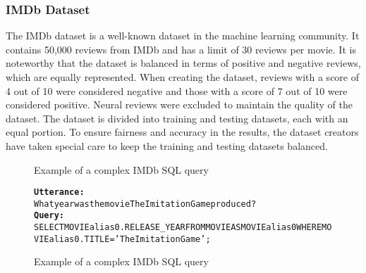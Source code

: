 \subsubsection{IMDb Dataset}

The IMDb dataset is a well-known dataset in the machine learning community. It contains 50,000 reviews from IMDb and has a limit of 30 reviews per movie\cite{maas-EtAl:2011:ACL-HLT2011}. It is noteworthy that the dataset is balanced in terms of positive and negative reviews, which are equally represented. When creating the dataset, reviews with a score of 4 out of 10 were considered negative and those with a score of 7 out of 10 were considered positive. Neural reviews were excluded to maintain the quality of the dataset. The dataset is divided into training and testing datasets, each with an equal portion. To ensure fairness and accuracy in the results, the dataset creators have taken special care to keep the training and testing datasets balanced.

\begin{figure}[H]
    \label{tab:IMDBsqlquery}
    \begin{AIbox}{Example of a complex IMDb SQL query}
        \vspace{-5px}
        \parbox{1\textwidth}{\scriptsize
        \begin{alltt} 
            {\bf Utterance:} \\ 
            What year was the movie The Imitation Game produced?
            \\
            {\bf Query:} \\
            SELECT MOVIEalias0.RELEASE\_YEAR FROM MOVIE AS MOVIEalias0 WHERE MOVIEalias0.TITLE = 'The Imitation Game' ;
        \end{alltt}
        }
        \vspace{-5px}
    \end{AIbox}
    \caption{Example of a complex IMDb SQL query}
\end{figure}
